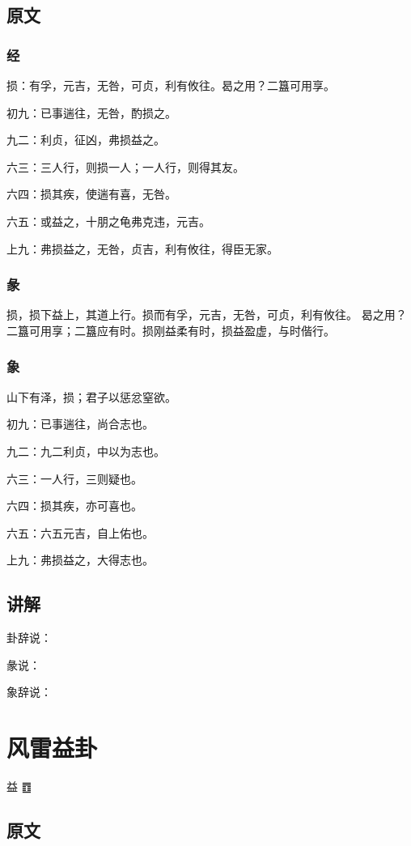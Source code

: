 \documentclass[12pt,oneside]{book}
\begin{document}
\section{原文}

\subsection{经}
损：有孚，元吉，无咎，可贞，利有攸往。曷之用？二簋可用享。

初九：已事遄往，无咎，酌损之。

九二：利贞，征凶，弗损益之。

六三：三人行，则损一人；一人行，则得其友。

六四：损其疾，使遄有喜，无咎。

六五：或益之，十朋之龟弗克违，元吉。

上九：弗损益之，无咎，贞吉，利有攸往，得臣无家。

\subsection{彖}
损，损下益上，其道上行。损而有孚，元吉，无咎，可贞，利有攸往。 曷之用？ 二簋可用享；二簋应有时。损刚益柔有时，损益盈虚，与时偕行。

\subsection{象}
山下有泽，损；君子以惩忿窒欲。

初九：已事遄往，尚合志也。

九二：九二利贞，中以为志也。

六三：一人行，三则疑也。

六四：损其疾，亦可喜也。

六五：六五元吉，自上佑也。

上九：弗损益之，大得志也。

\section{讲解}
卦辞说：

彖说：

象辞说：

\chapter{风雷益卦}
益 {\Large ䷩}
\section{原文}
\end{document}
